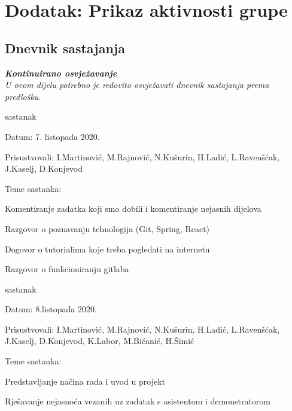 \chapter*{Dodatak: Prikaz aktivnosti grupe}
		
		\section*{Dnevnik sastajanja}
		
		\textbf{\textit{Kontinuirano osvježavanje}}\\
		
		 \textit{U ovom dijelu potrebno je redovito osvježavati dnevnik sastajanja prema predlošku.}
		
		\begin{packed_enum}
			\item  sastanak
			
			\item[] \begin{packed_item}
				\item Datum:  7. listopada 2020.
				\item Prisustvovali: I.Martinović, M.Rajnović, N.Kušurin, H.Ladić, L.Ravenšćak, J.Kaselj, D.Konjevod
				\item Teme sastanka: 
				\begin{packed_item}
					\item  Komentiranje zadatka koji smo dobili i komentiranje nejasnih dijelova
					\item  Razgovor o poznavanju tehnologija (Git, Spring, React)
					\item  Dogovor o tutorialima koje treba pogledati na internetu
					\item  Razgovor o funkcioniranju gitlaba
				\end{packed_item}
			\end{packed_item}
			
			\item  sastanak
			\item[] \begin{packed_item}
				\item Datum:  8.listopada 2020.
				\item Prisustvovali: I.Martinović, M.Rajnović, N.Kušurin, H.Ladić, L.Ravenšćak, J.Kaselj, D.Konjevod, K.Labor, M.Bićanić, H.Šimić
				\item Teme sastanka:
				\begin{packed_item}
					\item   Predstavljanje načina rada i uvod u projekt
					\item   Rješavanje nejasnoća vezanih uz zadatak s asistentom i demonstratorom
				\end{packed_item}
			\end{packed_item}
		

\end{packed_enum}

